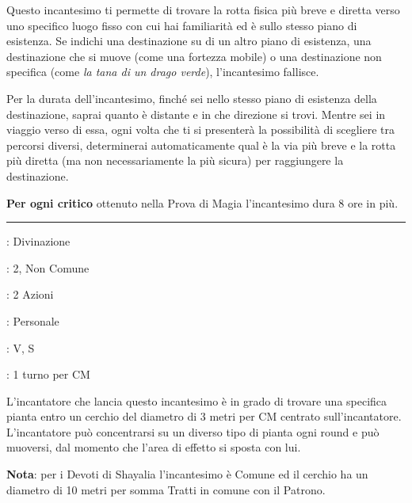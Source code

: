 \begin{multicols}{2}
Questo incantesimo ti permette di trovare la rotta fisica più breve e diretta verso uno specifico luogo fisso con cui hai familiarità ed è sullo stesso piano di esistenza. Se indichi una destinazione su di un altro piano di esistenza, una destinazione che si muove (come una fortezza mobile) o una destinazione non specifica (come \emph{la tana di un drago verde}), l'incantesimo fallisce.

Per la durata dell'incantesimo, finché sei nello stesso piano di esistenza della destinazione, saprai quanto è distante e in che direzione si trovi. Mentre sei in viaggio verso di essa, ogni volta che ti si presenterà la possibilità di scegliere tra percorsi diversi, determinerai automaticamente qual è la via più breve e la rotta più diretta (ma non necessariamente la più sicura) per raggiungere la destinazione.

\textbf{Per ogni critico} ottenuto nella Prova di Magia l'incantesimo dura 8 ore in più.

\smallskip\noindent\rule{\linewidth}{2pt} \hypertarget{Scopri Piante}{}\smallskip{}
\noindent
\begin{description}[noitemsep, topsep=0pt, parsep=0pt, partopsep=0pt, leftmargin=0cm, labelwidth=2.8cm]
	\item[\textbf{Lista di Magia}]: Divinazione
	\item[\textbf{Livello}]: 2, Non Comune
	\item[\textbf{T. di Lancio}]: 2 Azioni
	\item[\textbf{Gittata}]: Personale
	\item[\textbf{Componenti}]: V, S
	\item[\textbf{Durata}]: 1 turno per CM
\end{description}

L'incantatore che lancia questo incantesimo è in grado di trovare una specifica pianta entro un cerchio del diametro di 3 metri per CM centrato sull'incantatore. L'incantatore può concentrarsi su un diverso tipo di pianta ogni round e può muoversi, dal momento che l'area di effetto si sposta con lui.

\textbf{Nota}: per i Devoti di Shayalia l'incantesimo è Comune ed il cerchio ha un diametro di 10 metri per somma Tratti in comune con il Patrono.


\end{multicols}
